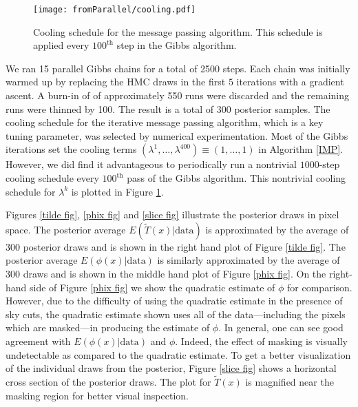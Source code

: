 \documentclass[noinfoline]{imsart}
\begin{document}
\begin{wrapfigure}{r}{0.5\textwidth}
{\texttt{[image: fromParallel/cooling.pdf]}}%
\caption{
Cooling schedule for the message passing algorithm. This schedule is applied every $100^\text{th}$ step in the Gibbs algorithm.
 }
\label{cooling}
\end{wrapfigure}

 

We ran 15 parallel Gibbs chains for a total of 2500 steps. Each chain was initially warmed up by replacing the HMC draws in the first $5$ iterations with a gradient ascent.  A burn-in of of approximately 550 runs were discarded and the remaining runs were thinned by 100. The result is a total of 300 posterior samples. The cooling schedule for the iterative message passing algorithm, which is a key tuning parameter,  was selected by numerical experimentation.  Most of the Gibbs iterations set the cooling terms $(\lambda^1,\ldots, \lambda^{400}) \equiv (1,\ldots, 1)$  in Algorithm \ref{IMP}. However, we did find it advantageous to periodically run a nontrivial $1000$-step cooling schedule every $100^\text{th}$ pass of the Gibbs algorithm. This nontrivial cooling schedule for $\lambda^k$ is plotted in Figure \ref{cooling}.




Figures \ref{tilde fig}, \ref{phix fig} and \ref{slice fig}  illustrate the posterior draws in pixel space. The posterior average $E(\widetilde T(x) | \text{data})$ is approximated by the average of 300 posterior draws and is shown in the right hand plot of Figure \ref{tilde fig}. The posterior average $E(\phi(x) |\text{data})$ is similarly approximated by the average of 300 draws and is shown in the middle hand plot of Figure \ref{phix fig}. On the right-hand side of  Figure \ref{phix fig} we show the quadratic estimate of $\phi$ for comparison. However, due to the difficulty of using the quadratic estimate in the presence of sky cuts, the quadratic estimate shown uses all of the data---including the pixels which are masked---in producing the estimate of $\phi$. In general, one can see good agreement with $E(\phi(x) | \text{data})$  and $\phi$. Indeed, the effect of masking is visually undetectable as compared to the quadratic estimate.  To get a better visualization of the individual draws from the posterior, Figure \ref{slice fig} shows a horizontal cross section of the posterior draws. The plot for $\widetilde T(x)$ is magnified near the masking region for better visual inspection.
\end{document}
